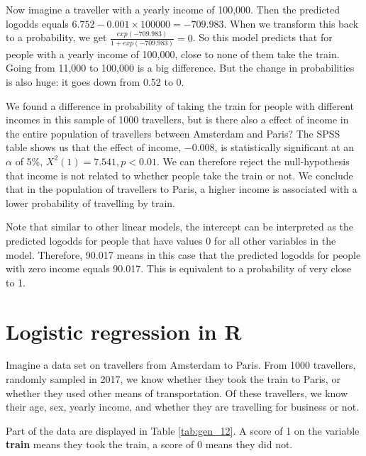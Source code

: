 \documentclass[]{book}\usepackage[]{graphicx}\usepackage[]{color}
\begin{document}
Now imagine a traveller with a yearly income of 100,000. Then the predicted logodds equals $6.752 - 0.001 \times 100000= -709.983$. When we transform this back to a probability, we get $\frac{exp(-709.983) } {1+ exp(-709.983) }= 0$. So this model predicts that for people with a yearly income of 100,000, close to none of them take the train.
Going from 11,000 to 100,000 is a big difference. But the change in probabilities is also huge: it goes down from 0.52 to 0.

We found a difference in probability of taking the train for people with different incomes in this sample of 1000 travellers, but is there also a effect of income in the entire population of travellers between Amsterdam and Paris? The SPSS table shows us that the effect of income, $- 0.008$, is statistically significant at an $\alpha$ of 5\%, $X^2(1)=7.541, p<0.01$. We can therefore reject the null-hypothesis that income is not related to whether people take the train or not. We conclude that in the population of travellers to Paris, a higher income is associated with a lower probability of travelling by train.

Note that similar to other linear models, the intercept can be interpreted as the predicted logodds for people that have values 0 for all other variables in the model. Therefore, 90.017 means in this case that the predicted logodds for people with zero income equals 90.017. This is equivalent to a probability of very close to 1.


\section{Logistic regression in R}

Imagine a data set on travellers from Amsterdam to Paris. From 1000 travellers, randomly sampled in 2017, we know whether they took the train to Paris, or whether they used other means of transportation. Of these travellers, we know their age, sex, yearly income, and whether they are travelling for business or not.

Part of the data are displayed in Table \ref{tab:gen_12}. A score of 1 on the variable \textbf{train} means they took the train, a score of 0 means they did not.
\end{document}
